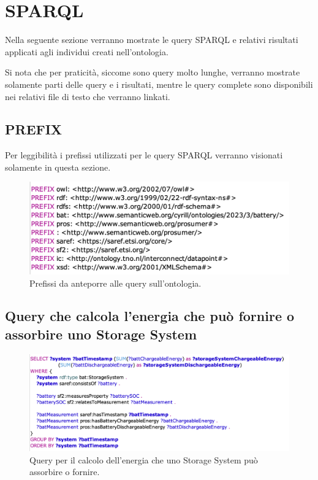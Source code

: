 \section{SPARQL}
Nella seguente sezione verranno mostrate le query SPARQL e relativi risultati applicati agli individui creati nell'ontologia.

Si nota che per praticità, siccome sono query molto lunghe, verranno mostrate solamente parti delle query e i risultati, mentre le query complete sono disponibili nei relativi file di testo che verranno linkati.

\subsection{PREFIX}
Per leggibilità i prefissi utilizzati per le query SPARQL verranno visionati solamente in questa sezione.

\begin{figure}[H]
    \centering
    \includegraphics[width=15cm]{images/prefissi.png}
    \caption{Prefissi da anteporre alle query sull'ontologia.}
    \label{fig:prefix}
\end{figure}

\subsection{Query che calcola l'energia che può fornire o assorbire uno Storage System}

\begin{figure}[H]
    \centering
    \includegraphics[width=15cm]{images/subquery.png}
    \caption{Query per il calcolo dell'energia che uno Storage System può assorbire o fornire.}
    \label{fig:subquery}
\end{figure}


